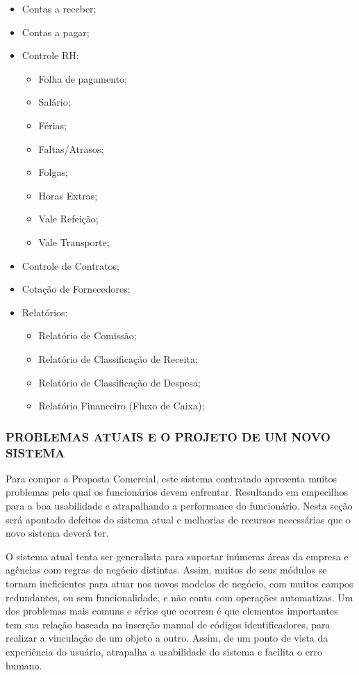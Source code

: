 \documentclass[
  12pt,				%
  openany,
  oneside,
  a4paper,			%
  english,			%
  brazil
]{article}
\numberwithin{figure}{section}
\numberwithin{table}{section}
\begin{document}
{\singlespacing
\begin{itemize}
  \item Contas a receber;
  \item Contas a pagar;
  \item Controle RH:
  \begin{itemize}
    \item Folha de pagamento;
    \item Salário;
    \item Férias;
    \item Faltas/Atrasos;
    \item Folgas;
    \item Horas Extras;
    \item Vale Refeição;
    \item Vale Transporte;
  \end{itemize}
  \item Controle de Contratos;
  \item Cotação de Fornecedores;
  \item Relatórios:
  \begin{itemize}
    \item Relatório de Comissão;
    \item Relatório de Classificação de Receita;
    \item Relatório de Classificação de Despesa;
    \item Relatório Financeiro (Fluxo de Caixa);
  \end{itemize}
\end{itemize}
}


\subsubsection{PROBLEMAS ATUAIS E O PROJETO DE UM NOVO SISTEMA}

Para compor a Proposta Comercial, este sistema contratado apresenta muitos problemas pelo qual os funcionários devem enfrentar. Resultando em empecilhos para a boa usabilidade e atrapalhando a performance do funcionário. Nesta seção será apontado defeitos do sistema atual e melhorias de recursos necessárias que o novo sistema deverá ter.

O sistema atual tenta ser generalista para suportar inúmeras áreas da empresa e agências com regras de negócio distintas. Assim, muitos de seus módulos se tornam ineficientes para atuar nos novos modelos de negócio, com muitos campos redundantes, ou sem funcionalidade, e não conta com operações automatizas. Um dos problemas mais comuns e sérios que ocorrem é que elementos importantes tem sua relação baseada na inserção manual de códigos identificadores, para realizar a vinculação de um objeto a outro. Assim, de um ponto de vista da experiência do usuário, atrapalha a usabilidade do sistema e facilita o erro humano.
\end{document}
